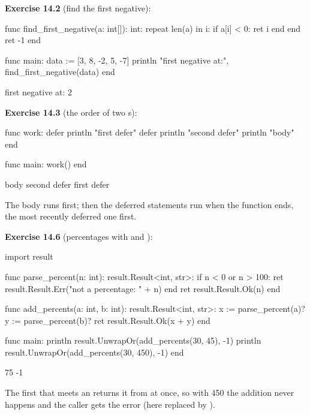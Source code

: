 \textbf{Exercise 14.2} (find the first negative):

\begin{salamen}
func find_first_negative(a: int[]): int:
    repeat len(a) in i:
        if a[i] < 0:
            ret i
        end
    end
    ret -1
end

func main:
    data := [3, 8, -2, 5, -7]
    println "first negative at:", find_first_negative(data)
end
\end{salamen}

\begin{progout}
first negative at: 2
\end{progout}

\textbf{Exercise 14.3} (the order of two s):

\begin{salamen}
func work:
    defer println "first defer"
    defer println "second defer"
    println "body"
end

func main:
    work()
end
\end{salamen}

\begin{progout}
body
second defer
first defer
\end{progout}

The body runs first; then the deferred statements run when the function ends,
the most recently deferred one first.

\textbf{Exercise 14.6} (percentages with  and ):

\begin{salamen}
import result

func parse_percent(n: int): result.Result<int, str>:
    if n < 0 or n > 100:
        ret result.Result.Err("not a percentage: " + n)
    end
    ret result.Result.Ok(n)
end

func add_percents(a: int, b: int): result.Result<int, str>:
    x := parse_percent(a)?
    y := parse_percent(b)?
    ret result.Result.Ok(x + y)
end

func main:
    println result.UnwrapOr(add_percents(30, 45), -1)
    println result.UnwrapOr(add_percents(30, 450), -1)
end
\end{salamen}

\begin{progout}
75
-1
\end{progout}

The first  that meets an  returns it from
 at once, so with 450 the addition never happens and the
caller gets the error (here replaced by ).


